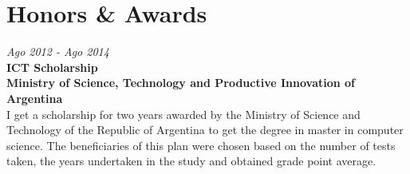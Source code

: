 \section{Honors \& Awards}

\begin{large}
    \textit{Ago 2012 - Ago 2014}\\
    \textbf{ICT Scholarship}\\
    \textbf{Ministry of Science, Technology and Productive Innovation of Argentina}\\
    I get a scholarship for two years awarded by the Ministry of Science and Technology of the Republic of Argentina to get the degree in master in computer science. The beneficiaries of this plan were chosen based on the number of tests taken, the years undertaken in the study and obtained grade point average.

\end{large}

